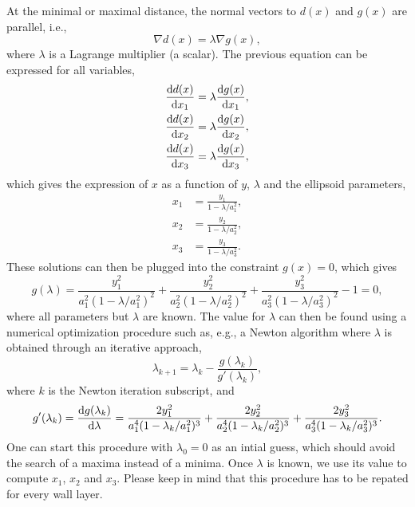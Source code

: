 \documentclass[]{article}
\begin{document}
 At the minimal or maximal distance, the normal vectors to $d(x)$ and $g(x)$ are parallel, i.e., 
\begin{equation}
	\nabla d(x) = \lambda \nabla g(x),
\end{equation}
where $\lambda$ is a Lagrange multiplier (a scalar). The previous equation can be expressed for all variables,
\begin{align}
	\frac{{\rm d} d(x)}{{\rm d} x_1} & =\lambda\frac{{\rm d} g(x)}{{\rm d} x_1}, \nonumber \\
	\frac{{\rm d} d(x)}{{\rm d} x_2} & =\lambda\frac{{\rm d} g(x)}{{\rm d} x_2}, \\
	\frac{{\rm d} d(x)}{{\rm d} x_3} & =\lambda\frac{{\rm d} g(x)}{{\rm d} x_3}, \nonumber 
\end{align}
which gives the expression of $x$ as a function of $y$, $\lambda$ and the ellipsoid parameters,
\begin{align}
	x_1 & =\frac{y_1}{1-\lambda/a_1^2}, \nonumber \\
	x_2 & =\frac{y_2}{1-\lambda/a_2^2}, \\
	x_3 & =\frac{y_3}{1-\lambda/a_3^2}. \nonumber 
\end{align}
These solutions can then be plugged into the constraint $g(x)=0$, which gives
\begin{equation}
	g(\lambda)=\frac{y_1^2}{a_1^2(1-\lambda/a_1^2)^2}+\frac{y_2^2}{a_2^2(1-\lambda/a_2^2)^2}+\frac{y_3^2}{a_3^2(1-\lambda/a_3^2)^2} -1 =0,
\end{equation}
where all parameters but $\lambda$ are known.
The value for $\lambda$ can then be found using a numerical optimization procedure such as, e.g., a Newton algorithm where $\lambda$ is obtained through an iterative approach,
\begin{equation}
	\lambda_{k+1} = \lambda_{k} - \frac{g(\lambda_k)}{g'(\lambda_k)},
\end{equation}
where $k$ is the Newton iteration subscript, and 
\begin{equation}
	g'(\lambda_k) = \frac{{\rm d} g(\lambda_k)}{{\rm d} \lambda}=\frac{2y_1^2}{a_1^4(1-\lambda_k/a_1^2)^3}+\frac{2y_2^2}{a_2^4(1-\lambda_k/a_2^2)^3}+\frac{2y_3^2}{a_3^4(1-\lambda_k/a_3^2)^3}.
\end{equation}
One can start this procedure with $\lambda_0=0$ as an intial guess, which should avoid the search of a maxima instead of a minima. Once $\lambda$ is known, we use its value to compute $x_1$, $x_2$ and $x_3$. Please keep in mind that this procedure has to be repated for every wall layer.
\end{document}
